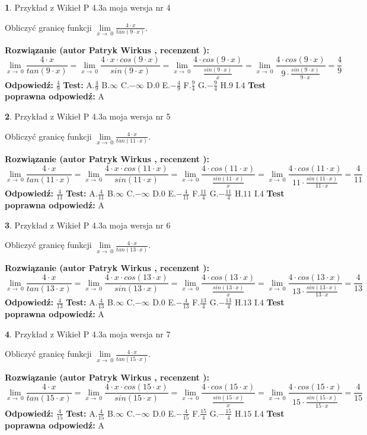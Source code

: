 \documentclass[12pt, a4paper]{article}
\theoremstyle{definition} %
\newtheorem{zad}{}
\newcommand{\zadStart}[1]{\begin{zad}#1\newline}
\newcommand{\zadStop}{\end{zad}}
\newcommand{\rozwStart}[2]{\noindent \textbf{Rozwiązanie (autor #1 , recenzent #2): }\newline}
\newcommand{\rozwStop}{\newline}
\newcommand{\odpStart}{\noindent \textbf{Odpowiedź:}\newline}
\newcommand{\odpStop}{\newline}
\newcommand{\testStart}{\noindent \textbf{Test:}\newline}
\newcommand{\testStop}{\newline}
\newcommand{\kluczStart}{\noindent \textbf{Test poprawna odpowiedź:}\newline}
\newcommand{\kluczStop}{\newline}
\begin{document}
\zadStart{Przykład z Wikieł P 4.3a moja wersja nr 4}


Obliczyć granicę funkcji $\lim\limits_{x\to\ 0}\frac{4 \cdot x}{tan(9 \cdot x)}$.
\zadStop
\rozwStart{Patryk Wirkus}{}
$$\lim\limits_{x\to\ 0}\frac{4 \cdot x}{tan(9 \cdot x)}=\lim\limits_{x\to\ 0}\frac{4 \cdot x \cdot cos(9 \cdot x)}{sin(9 \cdot x)}=\lim\limits_{x\to\ 0}\frac{4 \cdot cos(9 \cdot x)}{\frac{sin(9 \cdot x)}{x}}=\lim\limits_{x\to\ 0}\frac{4 \cdot cos(9 \cdot x)}{9 \cdot \frac{sin(9 \cdot x)}{9 \cdot x}} = \frac{4}{9}$$
\rozwStop
\odpStart
$\frac{4}{9}$
\odpStop
\testStart
A.$\frac{4}{9}$
B.$\infty$
C.$-\infty$
D.$0$
E.$-\frac{4}{9}$
F.$\frac{9}{4}$
G.$-\frac{9}{4}$
H.$9$
I.$4$
\testStop
\kluczStart
A
\kluczStop



\zadStart{Przykład z Wikieł P 4.3a moja wersja nr 5}


Obliczyć granicę funkcji $\lim\limits_{x\to\ 0}\frac{4 \cdot x}{tan(11 \cdot x)}$.
\zadStop
\rozwStart{Patryk Wirkus}{}
$$\lim\limits_{x\to\ 0}\frac{4 \cdot x}{tan(11 \cdot x)}=\lim\limits_{x\to\ 0}\frac{4 \cdot x \cdot cos(11 \cdot x)}{sin(11 \cdot x)}=\lim\limits_{x\to\ 0}\frac{4 \cdot cos(11 \cdot x)}{\frac{sin(11 \cdot x)}{x}}=\lim\limits_{x\to\ 0}\frac{4 \cdot cos(11 \cdot x)}{11 \cdot \frac{sin(11 \cdot x)}{11 \cdot x}} = \frac{4}{11}$$
\rozwStop
\odpStart
$\frac{4}{11}$
\odpStop
\testStart
A.$\frac{4}{11}$
B.$\infty$
C.$-\infty$
D.$0$
E.$-\frac{4}{11}$
F.$\frac{11}{4}$
G.$-\frac{11}{4}$
H.$11$
I.$4$
\testStop
\kluczStart
A
\kluczStop



\zadStart{Przykład z Wikieł P 4.3a moja wersja nr 6}


Obliczyć granicę funkcji $\lim\limits_{x\to\ 0}\frac{4 \cdot x}{tan(13 \cdot x)}$.
\zadStop
\rozwStart{Patryk Wirkus}{}
$$\lim\limits_{x\to\ 0}\frac{4 \cdot x}{tan(13 \cdot x)}=\lim\limits_{x\to\ 0}\frac{4 \cdot x \cdot cos(13 \cdot x)}{sin(13 \cdot x)}=\lim\limits_{x\to\ 0}\frac{4 \cdot cos(13 \cdot x)}{\frac{sin(13 \cdot x)}{x}}=\lim\limits_{x\to\ 0}\frac{4 \cdot cos(13 \cdot x)}{13 \cdot \frac{sin(13 \cdot x)}{13 \cdot x}} = \frac{4}{13}$$
\rozwStop
\odpStart
$\frac{4}{13}$
\odpStop
\testStart
A.$\frac{4}{13}$
B.$\infty$
C.$-\infty$
D.$0$
E.$-\frac{4}{13}$
F.$\frac{13}{4}$
G.$-\frac{13}{4}$
H.$13$
I.$4$
\testStop
\kluczStart
A
\kluczStop



\zadStart{Przykład z Wikieł P 4.3a moja wersja nr 7}


Obliczyć granicę funkcji $\lim\limits_{x\to\ 0}\frac{4 \cdot x}{tan(15 \cdot x)}$.
\zadStop
\rozwStart{Patryk Wirkus}{}
$$\lim\limits_{x\to\ 0}\frac{4 \cdot x}{tan(15 \cdot x)}=\lim\limits_{x\to\ 0}\frac{4 \cdot x \cdot cos(15 \cdot x)}{sin(15 \cdot x)}=\lim\limits_{x\to\ 0}\frac{4 \cdot cos(15 \cdot x)}{\frac{sin(15 \cdot x)}{x}}=\lim\limits_{x\to\ 0}\frac{4 \cdot cos(15 \cdot x)}{15 \cdot \frac{sin(15 \cdot x)}{15 \cdot x}} = \frac{4}{15}$$
\rozwStop
\odpStart
$\frac{4}{15}$
\odpStop
\testStart
A.$\frac{4}{15}$
B.$\infty$
C.$-\infty$
D.$0$
E.$-\frac{4}{15}$
F.$\frac{15}{4}$
G.$-\frac{15}{4}$
H.$15$
I.$4$
\testStop
\kluczStart
A
\kluczStop
\end{document}
